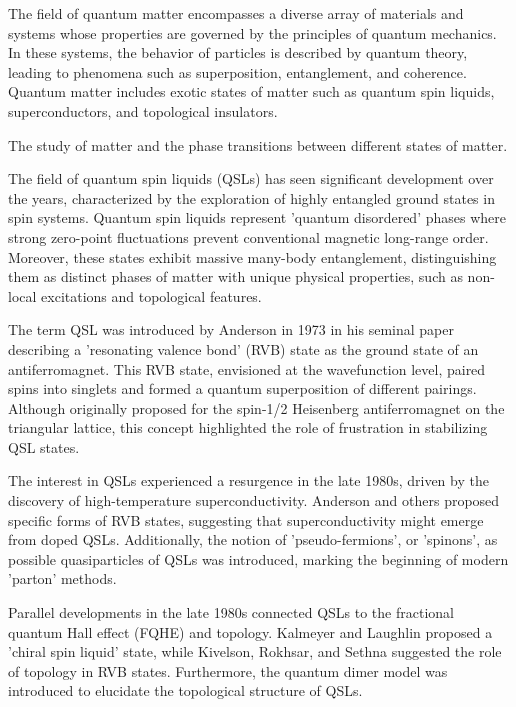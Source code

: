 
The field of quantum matter encompasses a diverse array of materials and systems whose properties are governed by the principles of quantum mechanics. In these systems, the behavior of particles is described by quantum theory, leading to phenomena such as superposition, entanglement, and coherence. Quantum matter includes exotic states of matter such as quantum spin liquids, superconductors, and topological insulators.

The study of matter and the phase transitions between different states of matter.



The field of quantum spin liquids (QSLs) has seen significant development over the years, characterized by the exploration of highly entangled ground states in spin systems. Quantum spin liquids represent 'quantum disordered' phases where strong zero-point fluctuations prevent conventional magnetic long-range order. Moreover, these states exhibit massive many-body entanglement, distinguishing them as distinct phases of matter with unique physical properties, such as non-local excitations and topological features.

The term QSL was introduced by Anderson in 1973 in his seminal paper describing a 'resonating valence bond' (RVB) state as the ground state of an antiferromagnet. This RVB state, envisioned at the wavefunction level, paired spins into singlets and formed a quantum superposition of different pairings. Although originally proposed for the spin-1/2 Heisenberg antiferromagnet on the triangular lattice, this concept highlighted the role of frustration in stabilizing QSL states.

The interest in QSLs experienced a resurgence in the late 1980s, driven by the discovery of high-temperature superconductivity. Anderson and others proposed specific forms of RVB states, suggesting that superconductivity might emerge from doped QSLs. Additionally, the notion of 'pseudo-fermions', or 'spinons', as possible quasiparticles of QSLs was introduced, marking the beginning of modern 'parton' methods.

Parallel developments in the late 1980s connected QSLs to the fractional quantum Hall effect (FQHE) and topology. Kalmeyer and Laughlin proposed a 'chiral spin liquid' state, while Kivelson, Rokhsar, and Sethna suggested the role of topology in RVB states. Furthermore, the quantum dimer model was introduced to elucidate the topological structure of QSLs.

